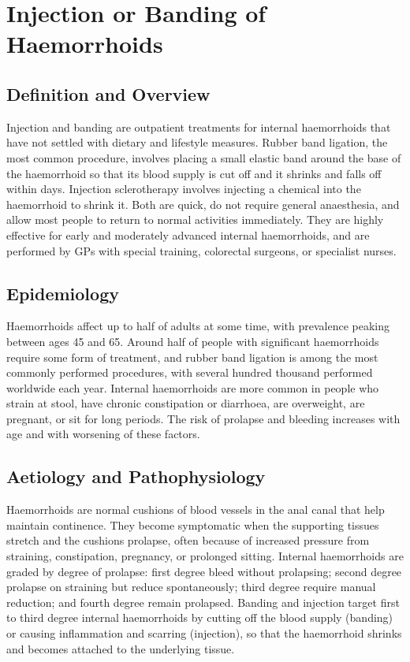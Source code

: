 \chapter{Injection or Banding of Haemorrhoids}

\section*{Definition and Overview}
Injection and banding are outpatient treatments for internal haemorrhoids that have not settled with dietary and lifestyle measures. Rubber band ligation, the most common procedure, involves placing a small elastic band around the base of the haemorrhoid so that its blood supply is cut off and it shrinks and falls off within days. Injection sclerotherapy involves injecting a chemical into the haemorrhoid to shrink it. Both are quick, do not require general anaesthesia, and allow most people to return to normal activities immediately. They are highly effective for early and moderately advanced internal haemorrhoids, and are performed by GPs with special training, colorectal surgeons, or specialist nurses.

\section*{Epidemiology}
Haemorrhoids affect up to half of adults at some time, with prevalence peaking between ages 45 and 65. Around half of people with significant haemorrhoids require some form of treatment, and rubber band ligation is among the most commonly performed procedures, with several hundred thousand performed worldwide each year. Internal haemorrhoids are more common in people who strain at stool, have chronic constipation or diarrhoea, are overweight, are pregnant, or sit for long periods. The risk of prolapse and bleeding increases with age and with worsening of these factors.

\section*{Aetiology and Pathophysiology}
Haemorrhoids are normal cushions of blood vessels in the anal canal that help maintain continence. They become symptomatic when the supporting tissues stretch and the cushions prolapse, often because of increased pressure from straining, constipation, pregnancy, or prolonged sitting. Internal haemorrhoids are graded by degree of prolapse: first degree bleed without prolapsing; second degree prolapse on straining but reduce spontaneously; third degree require manual reduction; and fourth degree remain prolapsed. Banding and injection target first to third degree internal haemorrhoids by cutting off the blood supply (banding) or causing inflammation and scarring (injection), so that the haemorrhoid shrinks and becomes attached to the underlying tissue.

